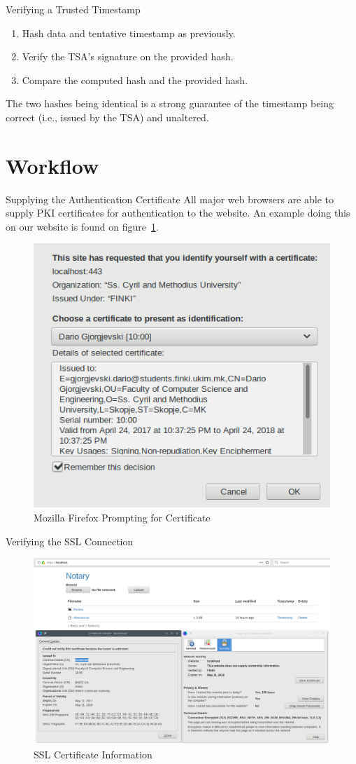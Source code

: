 \documentclass[xcolor={svgnames, table}, usepdftitle=false]{beamer}
\begin{document}
\begin{frame}{Verifying a Trusted Timestamp}
  \begin{enumerate}
  \item Hash data and tentative timestamp as previously.
  \item Verify the TSA's signature on the provided hash.
  \item Compare the computed hash and the provided hash.
  \end{enumerate}

  The two hashes being identical is a strong guarantee of the
  timestamp being correct (i.e., issued by the TSA) and unaltered.
\end{frame}

\section{Workflow}

\begin{frame}{Supplying the Authentication Certificate}
  All major web browsers are able to supply PKI certificates for
  authentication to the website.  An example doing this on our website
  is found on figure~\ref{fig:certificate-prompt}.
  \begin{figure}[H]
    \centering
    \includegraphics[width=.5\textwidth]{CertificatePrompt.png}
    \caption{Mozilla Firefox Prompting for Certificate}\label{fig:certificate-prompt}
  \end{figure}
\end{frame}

\begin{frame}{Verifying the SSL Connection}
  \begin{figure}[H]
    \centering
    \includegraphics[width=.75\textwidth]{SecureConnection.png}
    \caption{SSL Certificate Information}\label{fig:secure-connection}
  \end{figure}
\end{frame}
\end{document}
